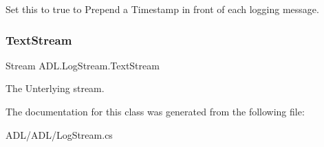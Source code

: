 Set this to true to Prepend a Timestamp in front of each logging message. 

\mbox{\label{class_a_d_l_1_1_log_stream_a65680991404e699fcafd4bc729504fc3}} 
\subsubsection{\texorpdfstring{Text\+Stream}{TextStream}}
{\footnotesize\ttfamily Stream A\+D\+L.\+Log\+Stream.\+Text\+Stream\hspace{0.3cm}{\ttfamily [get]}}



The Unterlying stream. 



The documentation for this class was generated from the following file\+:\begin{DoxyCompactItemize}
\item 
A\+D\+L/\+A\+D\+L/Log\+Stream.\+cs\end{DoxyCompactItemize}
